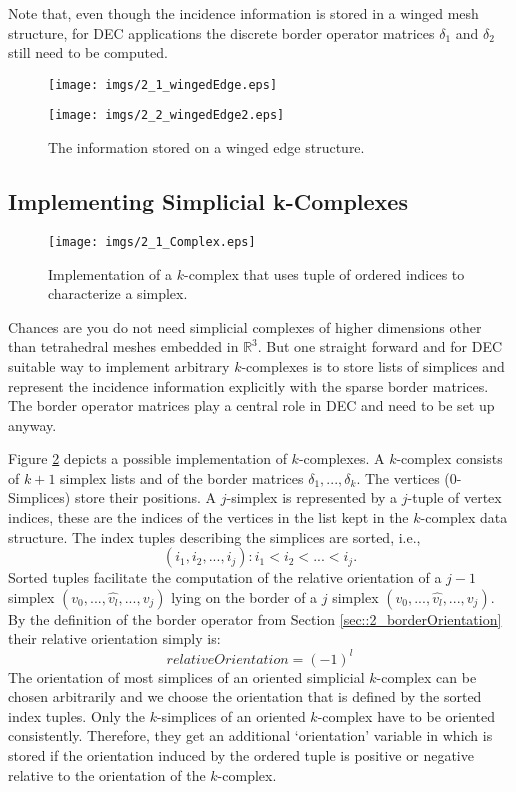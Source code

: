 Note that, even though the incidence information is stored in a winged mesh structure, for DEC applications the discrete border operator matrices $\delta_1$ and $\delta_2$ still need to be computed.

\begin{figure}[tb]
\begin{center}
\texttt{[image: imgs/2\_1\_wingedEdge.eps]}%
\vspace{0.5cm}

\texttt{[image: imgs/2\_2\_wingedEdge2.eps]}
\end{center}
\caption{The information stored on a winged edge structure.}%
\label{figs::2_1_wingedEdge}%
\end{figure}


\subsection{Implementing Simplicial k-Complexes }

\begin{figure}[t]
	\begin{center}
	\texttt{[image: imgs/2\_1\_Complex.eps]}%
	\end{center}
	\caption{Implementation of a $k$-complex that uses tuple of ordered indices to characterize a simplex.}%
	\label{fig::2_1_Complex}%
\end{figure}

Chances are you do not need simplicial complexes of higher dimensions other than tetrahedral meshes embedded in $\mathbb R^3$. But one straight forward and for DEC suitable way to implement arbitrary $k$-complexes is to store lists of simplices and represent the incidence information explicitly with the sparse border matrices. The border operator matrices play a central role in DEC and need to be set up anyway.

Figure \ref{fig::2_1_Complex} depicts a possible implementation of $k$-complexes.  A $k$-complex consists of $k+1$ simplex lists and of the border matrices $\delta_1,...,\delta_k$. The vertices (0-Simplices) store their positions. A $j$-simplex is represented by a $j$-tuple of vertex indices, these are the indices of the vertices in the list kept in the $k$-complex data structure. The index tuples describing the simplices are sorted, i.e.,
\[(i_1,i_2,...,i_j): i_1 < i_2 <...<i_j.\] 
Sorted tuples facilitate the computation of the relative orientation of a $j-1$ simplex $(v_0,...,\widehat{v_l},..., v_{j})$ lying on the border of a $j$ simplex $(v_0,...,\widehat{v_l},..., v_{j})$. By the definition of the border operator from Section \ref{sec::2_borderOrientation} their relative orientation simply is:
\[relativeOrientation = (-1)^l\]
The orientation of most simplices of an oriented simplicial $k$-complex can be chosen arbitrarily and we choose the orientation that is defined by the sorted index tuples. Only the $k$-simplices of an oriented $k$-complex have to be oriented consistently. Therefore, they get an additional `orientation' variable in which is stored if the orientation induced by the ordered tuple is positive or negative relative to the orientation of the $k$-complex.


